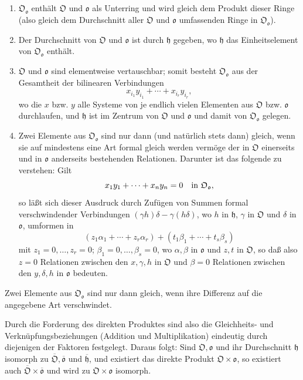 \begin{enumerate}
\item[(1)] $\mathfrak O_{\mathfrak o}$ enthält $\mathfrak O$ und $\mathfrak o$ als Unterring und wird gleich dem Produkt dieser Ringe (also gleich dem Durchschnitt aller $\mathfrak O$ und $\mathfrak o$ umfassenden Ringe in $\mathfrak O_{\mathfrak o}$).

\item[(2)] Der Durchschnitt von $\mathfrak O$ und $\mathfrak o$ ist durch $\mathfrak h$ gegeben, wo $\mathfrak h$ das Einheitselement von $\mathfrak O_{\mathfrak o}$ enthält.

\item[(3)] $\mathfrak O$ und $\mathfrak o$ sind elementweise vertauschbar; somit besteht $\mathfrak O_{\mathfrak o}$ aus der Gesamtheit der bilinearen Verbindungen
\[
x_{i_1}y_{i_1}+\cdots+x_{i_r}y_{i_r},
\]
wo die $x$ bzw. $y$ alle Systeme von je endlich vielen Elementen aus $\mathfrak O$ bzw. $\mathfrak o$ durchlaufen, und $\mathfrak h$ ist im Zentrum von $\mathfrak O$ und $\mathfrak o$ und damit von $\mathfrak O_{\mathfrak o}$ gelegen.

\item[(4)] Zwei Elemente aus $\mathfrak O_{\mathfrak o}$ sind nur dann (und natürlich stets dann) gleich, wenn sie auf mindestens eine Art formal gleich werden vermöge der in $\mathfrak O$ einerseits und in $\mathfrak o$ anderseits bestehenden Relationen. Darunter ist das folgende zu verstehen: Gilt
\[
x_1y_1+\cdots+x_ny_n=0
\quad\hbox{in }\mathfrak O_{\mathfrak o},
\]
so läßt sich dieser Ausdruck durch Zufügen von Summen formal verschwindender Verbindungen $(\gamma h)\delta-\gamma(h\delta)$, wo $h$ in $\mathfrak h$, $\gamma$ in $\mathfrak O$ und $\delta$ in $\mathfrak o$, umformen in
\[
(z_1\alpha_1+\cdots+z_r\alpha_r)+(t_1\beta_1+\cdots+t_s\beta_s)
\]
mit $z_1=0,\ldots,z_r=0$; $\beta_1=0,\ldots,\beta_s=0$, wo $\alpha,\beta$ in $\mathfrak o$ und $z,t$ in $\mathfrak O$, so daß also $z=0$ Relationen zwischen den $x,\gamma,h$ in $\mathfrak O$ und $\beta=0$ Relationen zwischen den $y,\delta,h$ in $\mathfrak o$ bedeuten.
\end{enumerate}

Zwei Elemente aus $\mathfrak O_{\mathfrak o}$ sind nur dann gleich, wenn ihre Differenz auf die angegebene Art verschwindet.

Durch die Forderung des direkten Produktes sind also die Gleichheits- und Verknüpfungsbeziehungen (Addition und Multiplikation) eindeutig durch diejenigen der Faktoren festgelegt. Daraus folgt: Sind $\mathfrak O,\mathfrak o$ und ihr Durchschnitt $\mathfrak h$ isomorph zu $\overline{\mathfrak O},\overline{\mathfrak o}$ und $\overline{\mathfrak h}$, und existiert das direkte Produkt $\mathfrak O\times\mathfrak o$, so existiert auch $\overline{\mathfrak O}\times\overline{\mathfrak o}$ und wird zu $\mathfrak O\times\mathfrak o$ isomorph.

